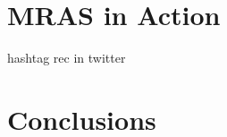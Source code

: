 \documentclass{bsu-ms}
\begin{document}
\chapter{MRAS in Action}
hashtag rec in twitter



%
%

\chapter{Conclusions}





%
%



{}



%
%


\appendix

\end{document}
